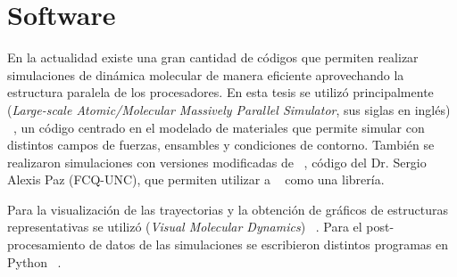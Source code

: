 \section{Software}

En la actualidad existe una gran cantidad de códigos que permiten realizar 
simulaciones de dinámica molecular de manera eficiente aprovechando la estructura
paralela de los procesadores. En esta tesis se utilizó principalmente  
(\textit{Large-scale Atomic/Molecular Massively Parallel Simulator}, sus siglas
en inglés) ~\cite{lammps1, lammps2}, un código centrado en el modelado de 
materiales que permite simular con distintos campos de fuerzas, ensambles y 
condiciones de contorno. También se realizaron simulaciones con versiones 
modificadas de  ~\cite{gems}, código del Dr. Sergio Alexis Paz 
(FCQ-UNC), que permiten utilizar a  ~\cite{dftb+} como una librería.

Para la visualización de las trayectorias y la obtención de gráficos de 
estructuras representativas se utilizó  (\textit{Visual Molecular 
Dynamics}) ~\cite{vmd}. Para el post-procesamiento de datos de las simulaciones
se escribieron distintos programas en Python ~\cite{exma, sierras}.

